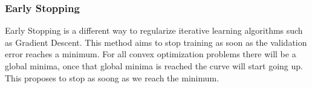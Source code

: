 \documentclass[12pt]{article}
\begin{document}
        \subsubsection{Early Stopping}
            Early Stopping is a different way to regularize iterative learning algorithms such as Gradient Descent. This method aims to stop training as soon as the validation error reaches a minimum. For all
            convex optimization problems there will be a global minima, once that global minima is reached the curve will start going up. This proposes to stop as soong as we reach the minimum.

\printindex
\end{document}
